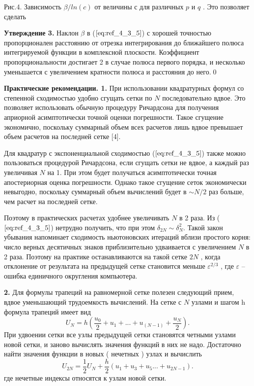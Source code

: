 Рис.4. Зависимость $\beta / ln(c)$ от величины с для различных $p$ и $q$ .
Это позволяет сделать

\textbf{Утверждение 3.} Наклон $\beta$ в ($\ref{eq:ref_4_3_5}$) с хорошей точностью пропорционален
расстоянию от отрезка интегрирования до ближайшего полюса интегрируемой
функции в комплексной плоскости. Коэффициент пропорциональности достигает 2 в случае полюса первого порядка, и несколько уменьшается с увеличением кратности полюса и расстояния до него.\qed

\textbf{Практические рекомендации. 1.} При использовании квадратурных
формул со степенной сходимостью удобно сгущать сетки по $N$
последовательно вдвое. Это позволяет использовать обычную процедуру
Ричардсона для получения априорной асимптотически точной оценки
погрешности. Такое сгущение экономично, поскольку суммарный объем всех
расчетов лишь вдвое превышает объем расчетов на последней сетке [4].

Для квадратур с экспоненциальной сходимостью ($\ref{eq:ref_4_3_5}$) также можно
пользоваться процедурой Ричардсона, если сгущать сетки не вдвое, а каждый
раз увеличивая $N$ на 1. При этом будет получаться асимптотически точная
апостериорная оценка погрешности. Однако такое сгущение сеток
экономически невыгодно, поскольку суммарный объем вычислений будет в
$\sim N / 2$ раз больше, чем расчет на последней сетке.

Поэтому в практических расчетах удобнее увеличивать $N$ в 2 раза. Из ($\ref{eq:ref_4_3_5}$)
нетрудно получить, что при этом $\delta_{2N} \sim \delta_N^2$. Такой закон убывания напоминает
сходимость ньютоновских итераций вблизи простого корня: число верных
десятичных знаков приблизительно удваивается с увеличением $N$ в 2 раза.
Поэтому на практике останавливаются на такой сетке $2N$ , когда отклонение от
результата на предыдущей сетке становится меньше $\varepsilon^{2/3}$ , где $\varepsilon$ – ошибка
единичного округления компьютера.

\textbf{2.} Для формулы трапеций на равномерной сетке полезен следующий
прием, вдвое уменьшающий трудоемкость вычислений. На сетке с $N$ узлами и
шагом h формула трапеций имеет вид
\begin{equation}
U_N=h(\frac{u_0}{2}+u_1+...+u_(N-1)+\frac{u_N}{2}).
\end{equation}
При удвоении сетки все узлы предыдущей сетки становятся четными узлами
новой сетки, и заново вычислять значения функций в них не надо. Достаточно
найти значения функции в новых ( нечетных ) узлах и вычислить
\begin{equation}
U_{2N}=\frac{1}{2}U_N + \frac{h}{2}(u_1+u_3+u_5...+u_{2N-1}).
\end{equation}
где нечетные индексы относятся к узлам новой сетки.
\\

